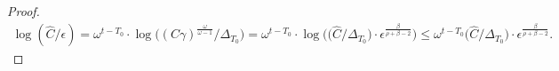 \documentclass[10pt]{article} %
\newtheorem{proof}{Proof}
\begin{document}
\begin{proof}
\begin{align}
        \log({\hat{C}}/{\epsilon})= \omega^{t-T_0} \cdot \log\Big({(C\gamma)^{\frac{\omega}{\omega-1}}}/{\Delta_{T_0}}\Big)=\omega^{t-T_0}\cdot\log\Big(\big(\hat{C}/{\Delta_{T_0}}\big)\cdot \epsilon^{\frac{\beta}{\rho+\beta-2}}\Big) \leq \omega^{t-T_0}\big(\hat{C}/{\Delta_{T_0}}\big)\cdot \epsilon^{\frac{\beta}{\rho+\beta-2}}\nonumber.
    \end{align}
    

\end{proof}
\end{document}
